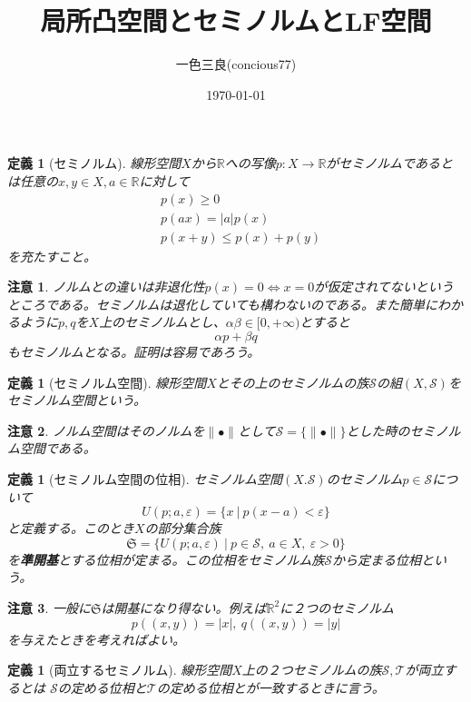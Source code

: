 \documentclass[leqno]{jsarticle}
\title{局所凸空間とセミノルムとLF空間}
\author{一色三良(concious77)}
\date{\today}
\newtheorem{df}[thm]{定義}
\newtheorem*{cau}{注意}
\newcommand{\rr}{\mathbb{R}}
\newcommand{\mgn}{\infty}
\newcommand{\ep}{\varepsilon}
\newcommand{\s}{\mathcal{S}}
\newcommand{\al}{\alpha}
\newcommand{\be}{\beta}
\begin{document}
\maketitle

\begin{df}[セミノルム]
線形空間$X$から$\rr$への写像$p:X\to \rr$がセミノルムであるとは任意の$x,y \in X,a\in \rr$に対して
\begin{eqnarray}
&p(x)\ge0\\ 
&p(ax)=|a|p(x)\\ 
&p(x+y)\le p(x)+p(y)
\end{eqnarray}
を充たすこと。
\end{df}
\begin{cau}
ノルムとの違いは非退化性$p(x)=0\iff x=0$が仮定されてないというところである。セミノルムは退化していても構わないのである。また簡単にわかるように$p,q$を$X$上のセミノルムとし、$\al\be \in [0,+\mgn)$とすると
\[
\al p+\be q
\]
もセミノルムとなる。証明は容易であろう。
\end{cau}


\begin{df}[セミノルム空間]
線形空間$X$とその上のセミノルムの族$\s$の組$(X,\s)$をセミノルム空間という。
\end{df}
\begin{cau}
ノルム空間はそのノルムを$\|\bullet\|$として$\s=\{\|\bullet\|\}$とした時のセミノルム空間である。
\end{cau}

\begin{df}[セミノルム空間の位相]セミノルム空間$(X.\s)$のセミノルム$p\in \s$について
\[
U(p;a,\ep)=\{x\ |\ p(x-a)<\ep\}
\]
と定義する。このとき$X$の部分集合族
\[
\mathfrak{S}=\{U(p;a,\ep)\ |\ p\in \s,\ a\in X,\ \ep>0\}
\]
を{\bf 準開基}とする位相が定まる。この位相をセミノルム族$\s$から定まる位相という。
\end{df}
\begin{cau}
一般に$\mathfrak{S}$は開基になり得ない。例えば$\rr^2$に２つのセミノルム
\[
p((x,y))=|x|,\ q((x,y))=|y|
\]
を与えたときを考えればよい。
\end{cau}

\begin{df}[両立するセミノルム]
線形空間$X$上の２つセミノルムの族$\s,\mathcal{T}$が両立するとは
$\s$の定める位相と$\mathcal{T}$の定める位相とが一致するときに言う。
\end{df}
\end{document}
